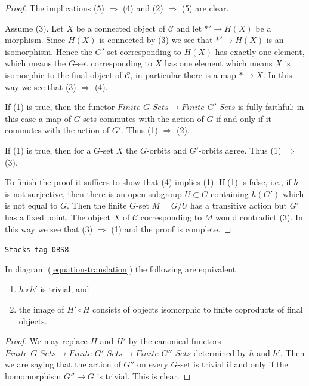 \begin{proof}
The implications (5) $\Rightarrow$ (4) and (2) $\Rightarrow$ (5) are clear.

\medskip\noindent
Assume (3). Let $X$ be a connected object of $\mathcal{C}$ and let
$*' \to H(X)$ be a morphism. Since $H(X)$ is connected by (3)
we see that $*' \to H(X)$ is an isomorphism. Hence the $G'$-set
corresponding to $H(X)$ has exactly one element, which means the
$G$-set corresponding to $X$ has one element which means $X$ is
isomorphic to the final object of $\mathcal{C}$, in particular
there is a map $* \to X$. In this way we see that (3) $\Rightarrow$ (4).

\medskip\noindent
If (1) is true, then the functor
$\textit{Finite-}G\textit{-Sets} \to \textit{Finite-}G'\textit{-Sets}$
is fully faithful: in this case a map of $G$-sets commutes with the
action of $G$ if and only if it commutes with the action of $G'$.
Thus (1) $\Rightarrow$ (2).

\medskip\noindent
If (1) is true, then for a $G$-set $X$ the $G$-orbits and $G'$-orbits
agree. Thus (1) $\Rightarrow$ (3).

\medskip\noindent
To finish the proof it suffices to show that (4) implies (1).
If (1) is false, i.e., if $h$ is not surjective, then there is
an open subgroup $U \subset G$ containing $h(G')$ which is not
equal to $G$. Then the finite $G$-set $M = G/U$ has a transitive
action but $G'$ has a fixed point. The object $X$ of $\mathcal{C}$
corresponding to $M$ would contradict (3). In this way we see that
(3) $\Rightarrow$ (1) and the proof is complete.
\end{proof}

\begin{lemma}
\label{pione-lemma-composition-trivial}
\href{https://stacks.math.columbia.edu/tag/0BS8}{\texttt{Stacks tag 0BS8}}

In diagram (\ref{equation-translation}) the following are equivalent
\begin{enumerate}
\item $h \circ h'$ is trivial, and
\item the image of $H' \circ H$ consists of objects isomorphic to finite
coproducts of final objects.
\end{enumerate}
\end{lemma}

\begin{proof}
We may replace $H$ and $H'$ by the canonical functors
$\textit{Finite-}G\textit{-Sets} \to \textit{Finite-}G'\textit{-Sets}
\to \textit{Finite-}G''\textit{-Sets}$ determined by $h$ and $h'$.
Then we are saying that the action of $G''$ on every $G$-set is trivial
if and only if the homomorphism $G'' \to G$ is trivial. This is clear.
\end{proof}


